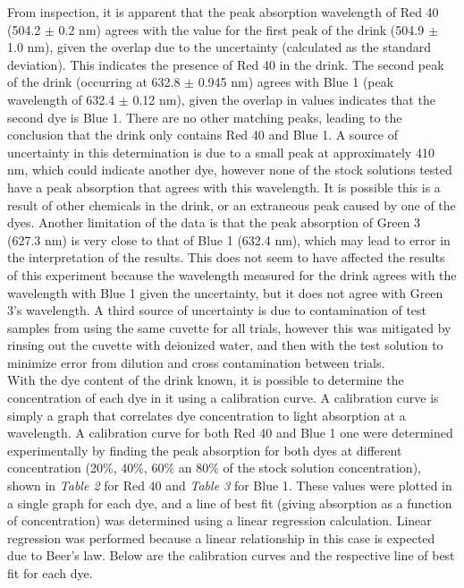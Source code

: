 \documentclass[12pt]{article}
\begin{document}
From inspection, it is apparent that the peak absorption wavelength of Red 40 (504.2 $\pm$ 0.2 nm) agrees with the value for the first peak of the drink (504.9 $\pm$ 1.0 nm), given the overlap due to the uncertainty (calculated as the standard deviation). This indicates the presence of Red 40 in the drink. The second peak of the drink (occurring at 632.8 $\pm$ 0.945 nm) agrees with Blue 1 (peak wavelength of 632.4 $\pm$ 0.12 nm), given the overlap in values indicates that the second dye is Blue 1. There are no other matching peaks, leading to the conclusion that the drink only contains Red 40 and Blue 1. A source of uncertainty in this determination is due to a small peak at approximately 410 nm, which could indicate another dye, however none of the stock solutions tested have a peak absorption that agrees with this wavelength. It is possible this is a result of other chemicals in the drink, or an extraneous peak caused by one  of the dyes. Another limitation of the data is that the peak absorption of Green 3 (627.3 nm) is very close to that of Blue 1 (632.4 nm), which may lead to error in the interpretation of the results. This does not seem to have affected the results of this experiment because the wavelength measured for the drink agrees with the wavelength with Blue 1 given the uncertainty, but it does not agree with Green 3's wavelength. A third source of uncertainty is due to contamination of test samples from using the same cuvette for all trials, however this was mitigated by rinsing out the cuvette with deionized water, and then with the test solution to minimize error from dilution and cross contamination between trials.
\vspace{12pt}\\
With the dye content of the drink known, it is possible to determine the concentration of each dye in it using a calibration curve. A calibration curve is simply a graph that correlates dye concentration to light absorption at a wavelength. A calibration curve for both Red 40 and Blue 1 one were determined experimentally by finding the peak absorption for both dyes at different concentration (20\%, 40\%, 60\% an 80\% of the stock solution concentration), shown in \textit{Table 2} for Red 40 and \textit{Table 3} for Blue 1. These values were plotted in a single graph for each dye, and a line of best fit (giving absorption as a function of concentration) was determined using a linear regression calculation. Linear regression was performed because a linear relationship in this case is expected due to Beer's law. Below are the calibration curves and the respective line of best fit for each dye.
\end{document}
